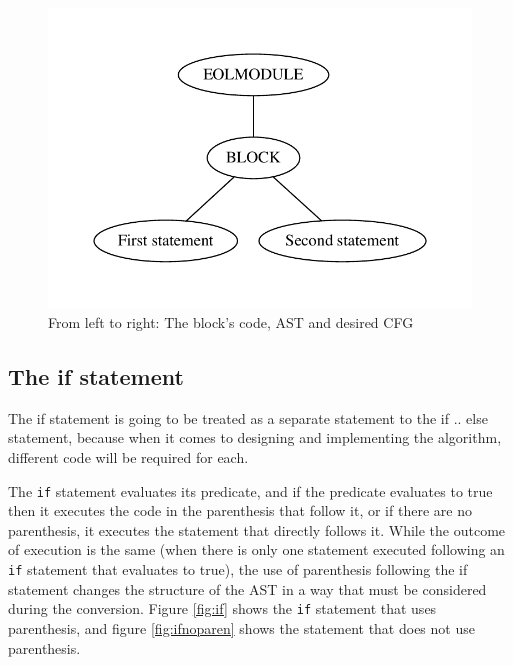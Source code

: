 \begin{figure}
\centering
\begin{minipage}{.3\textwidth}
  \centering
  
\end{minipage}%
\begin{minipage}{.3\textwidth}
  \centering
  \includegraphics[width=\linewidth]{figures/statements/block_AST.pdf}
\end{minipage}
\begin{minipage}{.3\textwidth}
  \centering
\end{minipage}
\caption{From left to right: The block's code, AST and desired CFG}
\label{fig:block}
\end{figure}

\subsection{The if statement}

The if statement is going to be treated as a separate statement to the if .. else statement, because when it comes to designing and implementing the algorithm, different code will be required for each.

The \verb|if| statement evaluates its predicate, and if the predicate evaluates to true then it executes the code in the parenthesis that follow it, or if there are no parenthesis, it executes the statement that directly follows it. While the outcome of execution is the same (when there is only one statement executed following an \verb|if| statement that evaluates to true), the use of parenthesis following the if statement changes the structure of the AST in a way that must be considered during the conversion. Figure \ref{fig:if} shows the \verb|if| statement that uses parenthesis, and figure \ref{fig:ifnoparen} shows the statement that does not use parenthesis.

